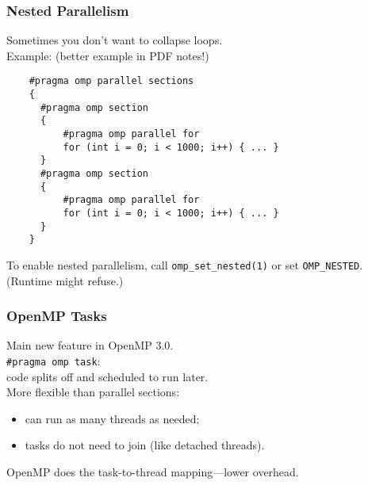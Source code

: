 \begin{frame}[fragile]
  \frametitle{Nested Parallelism}
  

  Sometimes you don't want to collapse loops.\\[1em]

  Example: (better example in PDF notes!)\\[1em]

{\small
  \begin{lstlisting}
    #pragma omp parallel sections
    {
      #pragma omp section
      { 
          #pragma omp parallel for
          for (int i = 0; i < 1000; i++) { ... } 
      }
      #pragma omp section
      {
          #pragma omp parallel for
          for (int i = 0; i < 1000; i++) { ... } 
      }
    }
\end{lstlisting}}

  To enable nested parallelism, call \verb+omp_set_nested(1)+ or
  set \verb+OMP_NESTED+. (Runtime might refuse.)\\[1em]

  
  


\end{frame}

\begin{frame}[fragile]
  \frametitle{OpenMP Tasks}
  

  Main new feature in OpenMP 3.0.\\[1em]

  \verb+#pragma omp task+:\\ \qquad code splits off and scheduled to run later.\\[1em]

  More flexible than parallel sections: 
  \begin{itemize}
   \item can run as many threads as needed;
   \item tasks do not need to join (like detached threads).
  \end{itemize}
  OpenMP does the task-to-thread mapping---lower overhead.

  


\end{frame}

